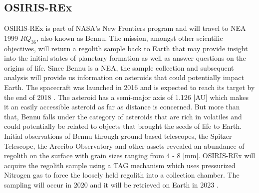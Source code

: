 \subsection{OSIRIS-REx}
\label{subsec:osiris_heritage}
\gls{OSIRIS-REx} is part of \gls{NASA}'s New Frontiers program and will travel to \gls{NEA} 1999 $RQ_{36}$, also known as Bennu. The mission, amongst other scientific objectives, will return a regolith sample back to Earth that may provide insight into the initial states of planetary formation as well as answer questions on the origins of life. Since Bennu is a \gls{NEA}, the sample collection and subsequent analysis will provide us information on asteroids that could potentially impact Earth. The spacecraft was launched in 2016 and is expected to reach its target by the end of 2018 \parencite{berry2013osiris}. The asteroid has a semi-major axis of 1.126 [AU] which makes it an easily accessible asteroid as far as distance is concerned. But more than that, Bennu falls under the category of asteroids that are rich in volatiles and could potentially be related to objects that brought the seeds of life to Earth. Initial observations of Bennu through ground based telescopes, the Spitzer Telescope, the Arecibo Observatory and other assets revealed an abundance of regolith on the surface with grain sizes ranging from 4 - 8 [mm]. \gls{OSIRIS-REx} will acquire the regolith sample using a \gls{TAG} mechanism which uses pressurized Nitrogen gas to force the loosely held regolith into a collection chamber. The sampling will occur in 2020 and it will be retrieved on Earth in 2023 \parencite{osirisMissionOverview}.

